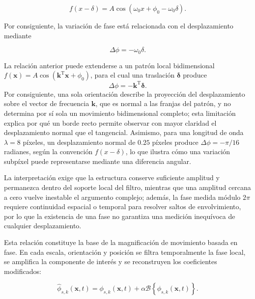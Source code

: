 \begin{equation}
    f(x-\delta)
    =
    A
    \cos
    \left(
        \omega_0x+\phi_0-\omega_0\delta
    \right).
    \label{eq:desplazamiento_fase}
\end{equation}

Por consiguiente, la variación de fase está relacionada con el desplazamiento mediante

\begin{equation}
    \Delta\phi=-\omega_0\delta.
    \label{eq:relacion_fase_desplazamiento}
\end{equation}

La relación anterior puede extenderse a un patrón local bidimensional $f(\mathbf{x})=A\cos(\mathbf{k}^{\mathrm{T}}\mathbf{x}+\phi_0)$, para el cual una traslación $\boldsymbol{\delta}$ produce
\begin{equation}
 \Delta\phi=-\mathbf{k}^{\mathrm{T}}\boldsymbol{\delta}.
 \label{eq:piramides_fase_proyeccion}
\end{equation}
Por consiguiente, una sola orientación describe la proyección del desplazamiento sobre el vector de frecuencia $\mathbf{k}$, que es normal a las franjas del patrón, y no determina por sí sola un movimiento bidimensional completo; esta limitación explica por qué un borde recto permite observar con mayor claridad el desplazamiento normal que el tangencial. Asimismo, para una longitud de onda $\lambda=8$ píxeles, un desplazamiento normal de $0.25$ píxeles produce $\Delta\phi=-\pi/16$ radianes, según la convención $f(x-\delta)$, lo que ilustra cómo una variación subpíxel puede representarse mediante una diferencia angular.

La interpretación exige que la estructura conserve suficiente amplitud y permanezca dentro del soporte local del filtro, mientras que una amplitud cercana a cero vuelve inestable el argumento complejo; además, la fase medida módulo $2\pi$ requiere continuidad espacial o temporal para resolver saltos de envolvimiento, por lo que la existencia de una fase no garantiza una medición inequívoca de cualquier desplazamiento.

Esta relación constituye la base de la magnificación de movimiento basada en fase. En cada escala, orientación y posición se filtra temporalmente la fase local, se amplifica la componente de interés y se reconstruyen los coeficientes modificados:

\begin{equation}
    \widehat{\phi}_{s,k}(\mathbf{x},t)
    =
    \phi_{s,k}(\mathbf{x},t)
    +
    \alpha
    \mathcal{B}
    \left\{
        \phi_{s,k}(\mathbf{x},t)
    \right\}.
    \label{eq:fase_steerable_magnificada}
\end{equation}

